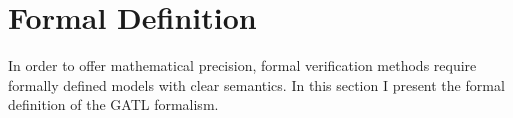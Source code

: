 \section{Formal Definition}\label{sec:activity-formal-definition}

\newcommand{\inflows}[1]{\delta(#1)}
\newcommand{\outflows}[1]{\Delta(#1)}
\newcommand{\sourcepin}[1]{\phi(#1)}
\newcommand{\targetpin}[1]{\Phi(#1)}
\newcommand{\sourcenode}[1]{\theta(#1)}
\newcommand{\targetnode}[1]{\Theta(#1)}

In order to offer mathematical precision, formal verification methods require formally defined models with clear semantics. In this section I present the formal definition of the GATL formalism.

